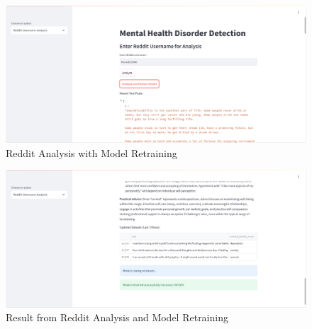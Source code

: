 \pagebreak

\begin{figure}[h!]  
    \centering
    \includegraphics[width=1.0\textwidth]{App Images/16 Interface.png}  
    \caption{Reddit Analysis with Model Retraining}
    \label{10i}  %
\end{figure}

\begin{figure}[h!]  
    \centering
    \includegraphics[width=1.0\textwidth]{App Images/17 Interface.png}  
    \caption{Result from Reddit Analysis and Model Retraining}
    \label{10i}  %
\end{figure}


\pagebreak



